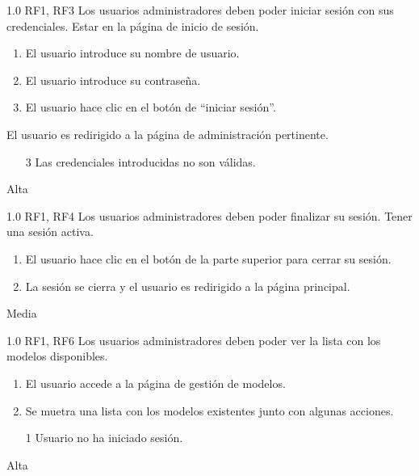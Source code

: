{1.0}
{RF1, RF3}
{Los usuarios administradores deben poder iniciar sesión con sus credenciales.}
{Estar en la página de inicio de sesión.}
{
    \begin{enumerate}
        \def\labelenumi{\arabic{enumi}.}
        \tightlist
        \item El usuario introduce su nombre de usuario.
        \item El usuario introduce su contraseña.
        \item El usuario hace clic en el botón de ``iniciar sesión''.
    \end{enumerate}
}
{El usuario es redirigido a la página de administración pertinente.}
{
    \begin{itemize}
        \item [3] Las credenciales introducidas no son válidas.
    \end{itemize}
}
{Alta}

{1.0}
{RF1, RF4}
{Los usuarios administradores deben poder finalizar su sesión.}
{Tener una sesión activa.}
{
    \begin{enumerate}
        \def\labelenumi{\arabic{enumi}.}
        \tightlist
        \item El usuario hace clic en el botón de la parte superior para cerrar su sesión.
        \item La sesión se cierra y el usuario es redirigido a la página principal.
    \end{enumerate}
}
{}
{}
{Media}

{1.0}
{RF1, RF6}
{Los usuarios administradores deben poder ver la lista con los modelos disponibles.}
{}
{
    \begin{enumerate}
        \def\labelenumi{\arabic{enumi}.}
        \tightlist
        \item El usuario accede a la página de gestión de modelos.
        \item Se muetra una lista con los modelos existentes junto con algunas acciones.
    \end{enumerate}
}
{}
{
    \begin{itemize}
        \item [1] Usuario no ha iniciado sesión.
    \end{itemize}
}
{Alta}

